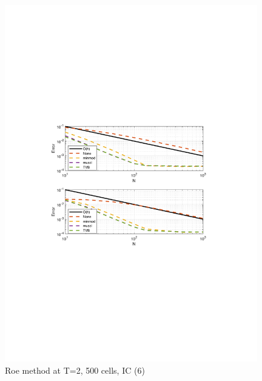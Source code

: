 \documentclass[11pt,a4paper]{article}
\begin{document}
\begin{figure}[!htb]
    \centering
    \includegraphics[width=11cm]{2_2_c_IC_2_Roe.pdf}
    \caption{Roe method at T=2, 500 cells, IC (6)}
    \label{fig:Roe_IC_2_error}
\end{figure}
\end{document}
